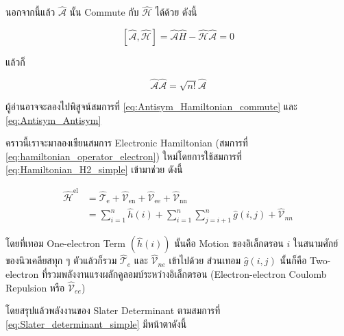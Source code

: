 นอกจากนี้แล้ว $\hat{\mathscr{A}}$ นั้น Commute กับ $\hat{\mathscr{H}}$ ได้ด้วย ดังนี้

\begin{equation}
    \label{eq:Antisym_Hamiltonian_commute}
    [\hat{\mathscr{A}}, \hat{\mathscr{H}}]
    = \hat{\mathscr{A}} \hat{H}-\hat{\mathscr{H}} \hat{\mathscr{A}}
    = 0
\end{equation}

\noindent แล้วก็

\begin{equation}
    \label{eq:Antisym_Antisym}
    \hat{\mathscr{A}} \hat{\mathscr{A}} = \sqrt{n !} \hat{\mathscr{A}}
\end{equation}

\noindent ผู้อ่านอาจจะลองไปพิสูจน์สมการที่ \ref{eq:Antisym_Hamiltonian_commute} และ \ref{eq:Antisym_Antisym}

คราวนี้เราจะมาลองเขียนสมการ Electronic Hamiltonian (สมการที่ \ref{eq:hamiltonian_operator_electron})
ใหม่โดยการใช้สมการที่ \ref{eq:Hamiltonian_H2_simple} เข้ามาช่วย ดังนี้

\begin{equation}
    \begin{aligned}
        \hat{\mathscr{H}}^{\text{el}}
         & = \hat{\mathscr{T}}_{\text{e}}
        + \hat{\mathscr{V}}_{\text{en}}
        + \hat{\mathscr{V}}_{\text{ee}}
        + \hat{\mathscr{V}}_{\text{nn}}   \\
         & = \sum_{i=1}^{n} \hat{h}(i)
        + \sum_{i=1}^{n} \sum_{j=i+1}^{n} \hat{g}(i,j) + \hat{\mathscr{V}}_{nn}
    \end{aligned}
\end{equation}

\noindent โดยที่เทอม One-electron Term $(\hat{h}(i))$ นั้นคือ Motion ของอิเล็กตรอน $i$ ในสนามศักย์ของนิวเคลียสทุก ๆ
ตัวแล้วก็รวม $\hat{\mathscr{T}}_e$ และ $\hat{\mathscr{V}}_{n e}$ เข้าไปด้วย ส่วนเทอม $\hat{g}(i, j)$ นั้นก็คือ Two-electron
ที่รวมพลังงานแรงผลักคูลอมบ์ระหว่างอิเล็กตรอน (Electron-electron Coulomb Repulsion หรือ $\hat{\mathscr{V}}_{e e}$)

โดยสรุปแล้วพลังงานของ Slater Determinant ตามสมการที่ \ref{eq:Slater_determinant_simple} มีหน้าตาดังนี้

